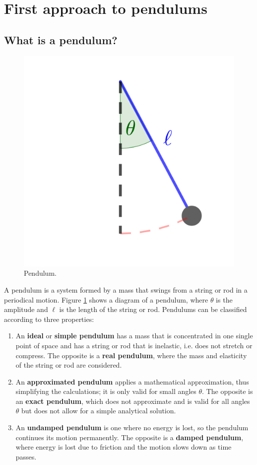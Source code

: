 \documentclass[12pt, a4paper, titlepage]{article}
\theoremstyle{definition}
\numberwithin{equation}{section}
\theoremstyle{definition}
\theoremstyle{definition}
\begin{document}
\section{First approach to pendulums}
\subsection{What is a pendulum?}
\begin{figure}[H]
    \centering
    \includegraphics[scale=0.7]{pendulum2.png}
    \caption{Pendulum.}
    \label{fig:pendulum}
\end{figure}
A pendulum is a system formed by a mass that swings from a string or rod in a periodical motion. Figure \ref{fig:pendulum} shows a diagram of a pendulum, where $\theta$ is the amplitude and $\ell$ is the length of the string or rod. Pendulums can be classified according to three properties: \parencite[p. 9]{pendulum}
\begin{enumerate}
\item An \textbf{ideal} or \textbf{simple pendulum} has a mass that is concentrated in one single point of space and has a string or rod that is inelastic, i.e. does not stretch or compress. The opposite is a \textbf{real pendulum}, where the mass and elasticity of the string or rod are considered.
\item An \textbf{approximated pendulum} applies a mathematical approximation, thus simplifying the calculations; it is only valid for small angles $\theta$. The opposite is an \textbf{exact pendulum}, which does not approximate and is valid for all angles $\theta$ but does not allow for a simple analytical solution.
\item An \textbf{undamped pendulum} is one where no energy is lost, so the pendulum continues its motion permanently. The opposite is a \textbf{damped pendulum}, where energy is lost due to friction and the motion slows down as time passes.
\end{enumerate}
\end{document}

